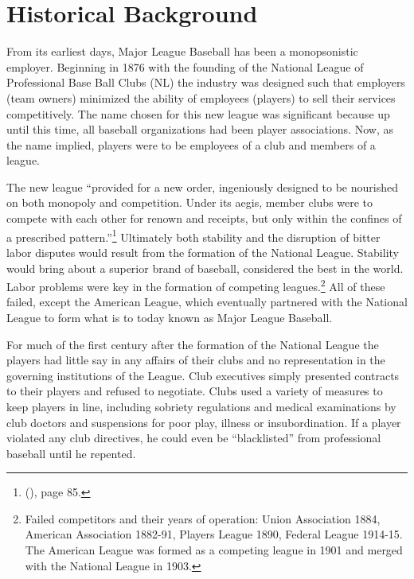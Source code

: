 \documentclass[12pt]{article}
\newcommand{\citee}[1]{\citename{#1} (\citeyear{#1})}
\begin{document}
\section{Historical Background}\label{s:history}
From its earliest days, Major League Baseball has been a monopsonistic employer.  Beginning in 1876 with the founding of the National League of Professional Base Ball Clubs (NL) the industry was designed such that employers (team owners) minimized the ability of employees (players) to sell their services competitively.  The name chosen for this new league was significant because up until this time, all baseball organizations had been player associations.  Now, as the name implied, players were to be employees of a club and members of a league.

The new league ``provided for a new order, ingeniously designed to be nourished on both monopoly and competition.  Under its aegis, member clubs were to compete with each other for renown and receipts, but only within the confines of a prescribed pattern.''\footnote{\citee{seymour}, page 85.}  Ultimately both stability and the disruption of bitter labor disputes would result from the formation of the National League.  Stability would bring about a superior brand of baseball, considered the best in the world.  Labor problems were key in the formation of competing leagues.\footnote{Failed competitors and their years of operation: Union Association 1884, American Association 1882-91, Players League 1890, Federal League 1914-15.  The American League was formed as a competing league in 1901 and merged with the National League in 1903.}  All of these failed, except the American League, which eventually partnered with the National League to form what is to today known as Major League Baseball.

For much of the first century after the formation of the National League the players had little say in any affairs of their clubs and no representation in the governing institutions of the League.  Club executives simply presented contracts to their players and refused to negotiate.  Clubs used a variety of measures to keep players in line, including sobriety regulations and medical examinations by club doctors and suspensions for poor play, illness or insubordination.  If a player violated any club directives, he could even be ``blacklisted'' from professional baseball until he repented.
\end{document}
